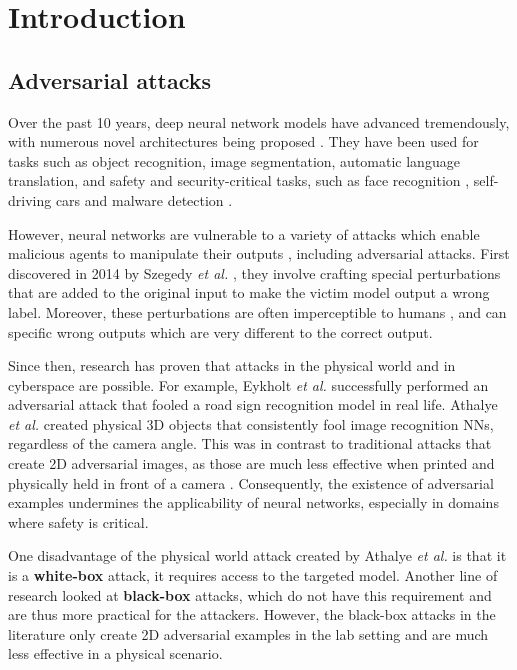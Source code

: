 \chapter{Introduction}
	\label{chap:intro}
	
\section{Adversarial attacks}
    \label{sec:introduction}

Over the past 10 years, deep neural network models have advanced tremendously, with numerous novel architectures being proposed \cite{alexnet, densenet, googlenet}. They have been used for tasks such as object recognition, image segmentation, automatic language translation, and safety and security-critical tasks, such as face recognition \cite{face_recognition}, self-driving cars \cite{self_driving_cars} and malware detection \cite{malware_detection}. 

However, neural networks are vulnerable to a variety of attacks which enable malicious agents to manipulate their outputs \cite{deep_leakage, trojan_attacks, poisoning_attacks, szegedy2014intriguing}, including adversarial attacks. First discovered in 2014 by Szegedy \textit{et al.} \cite{szegedy2014intriguing}, they involve crafting special perturbations that are added to the original input to make the victim model output a wrong label. Moreover, these perturbations are often imperceptible to humans \cite{szegedy2014intriguing}, and can specific wrong outputs which are very different to the correct output.

Since then, research has proven that attacks in the physical world \cite{evtimov_road_signs} and in cyberspace \cite{papernot_cyberspace_attack} are possible. For example, Eykholt \textit{et al.} \cite{evtimov_road_signs} successfully performed an adversarial attack that fooled a road sign recognition model in real life. Athalye \textit{et al.} \cite{athalye} created physical 3D objects that consistently fool image recognition NNs, regardless of the camera angle. This was in contrast to traditional attacks that create 2D adversarial images, as those are much less effective when printed and physically held in front of a camera \cite{lu_physical_experiments}. Consequently, the existence of adversarial examples undermines the applicability of neural networks, especially in domains where safety is critical.

One disadvantage of the physical world attack created by Athalye \textit{et al.} is that it is a \textbf{white-box} attack, it requires access to the targeted model. Another line of research looked at \textbf{black-box} attacks, which do not have this requirement \cite{akhtar} and are thus more practical for the attackers. However, the black-box attacks in the literature only create 2D adversarial examples in the lab setting and are much less effective in a physical scenario.

